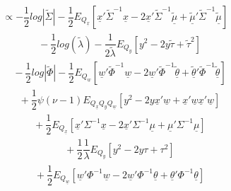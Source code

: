 \documentclass[fleqn]{minimal}
\begin{document}
\begin{align*}
  \ \ \ \ \ \
  \propto
  - \dfrac{1}{2}
  log \left| \tilde{\Sigma} \right|
  - \dfrac{1}{2}
  E_{Q_{\underline{x}}}
  \left[
    \underline{x}'\tilde{\Sigma}^{-1}\underline{x}
    - 2 \underline{x}'\tilde{\Sigma}^{-1}\underline{\tilde{\mu}}
    + \underline{\tilde{\mu}}'\tilde{\Sigma}^{-1}\underline{\tilde{\mu}}
  \right]
\end{align*}
\begin{align*}
  \ \ \ \ \ \ \ \ \ \
  - \dfrac{1}{2}
  log \left(
    \tilde{\lambda}
  \right)
  - \dfrac{1}{2\tilde{\lambda}}
  E_{Q_{y}}
  \left[
    y^2 - 2 y\tilde{\tau} + \tilde{\tau}^2
  \right]
\end{align*}
\begin{align*}
  \ \ \ \ \ \ \ \ \ \
  - \dfrac{1}{2}
  log \left| \tilde{\Phi} \right|
  - \dfrac{1}{2}
  E_{Q_{\underline{w}}}
  \left[
    \underline{w}'\tilde{\Phi}^{-1}\underline{w}
    - 2 \underline{w}'\tilde{\Phi}^{-1}\underline{\tilde{\theta}}
    + \underline{\tilde{\theta}}'\tilde{\Phi}^{-1}\underline{\tilde{\theta}}
  \right]
\end{align*}
\begin{align*}
  \ \ \ \ \ \ \ \ \ \
  + \dfrac{1}{2}
  \psi\left(\nu-1\right)
  E_{Q_{\underline{x}} Q_{y} Q_{\underline{w}}}
  \left[
    y^2 - 2y\underline{x}'\underline{w} + \underline{x}'\underline{w}\underline{x}'\underline{w}
  \right]
\end{align*}
\begin{align*}
  \ \ \ \ \ \ \ \ \ \
  + \dfrac{1}{2} E_{Q_{\underline{x}} }
  \left[
    \underline{x}'\Sigma^{-1}\underline{x}
    -2 \underline{x}'\Sigma^{-1}\underline{\mu}
    + \underline{\mu}'\Sigma^{-1}\underline{\mu}
  \right]
\end{align*}
\begin{align*}
  \ \ \ \ \ \ \ \ \ \
  + \dfrac{1}{2}
  \dfrac{1}{\lambda}
  E_{Q_{y}}
  \left[
    y^2 - 2y\tau + \tau^2
  \right]
\end{align*}
\begin{align*}
  \ \ \ \ \ \ \ \ \ \
  + \dfrac{1}{2} E_{Q_{\underline{w}}}
  \left[
    \underline{w}' \Phi^{-1}\underline{w}
    -2 \underline{w}' \Phi^{-1}\underline{\theta}
    + \underline{\theta}' \Phi^{-1}\underline{\theta}
  \right]
\end{align*}
\end{document}
